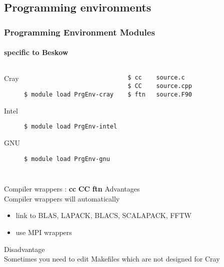 \subsection{Programming environments}
\begin{frame}[fragile]
  \frametitle{Programming Environment Modules}
  \framesubtitle{specific to \alert{Beskow}}

\begin{columns}[t]
  \begin{description}
  \item [Cray] \verb|$ module load PrgEnv-cray|
  \item [Intel] \verb|$ module load PrgEnv-intel|
  \item [GNU] \verb|$ module load PrgEnv-gnu|
  \end{description}
    \begin{verbatim}
$ cc	source.c
$ CC	source.cpp
$ ftn	source.F90
  \end{verbatim}
\end{columns}
  \begin{exampleblock}{Compiler wrappers : \alert{\textbf{cc} \textbf{CC} \textbf{ftn}}}
    \alert{Advantages}\\
    Compiler wrappers will automatically 
    \begin{itemize}
      \item link to BLAS, LAPACK, BLACS, SCALAPACK, FFTW\\
      \item use MPI wrappers\\
    \end{itemize}
    \alert{Disadvantage}\\
    Sometimes you need to edit Makefiles which are not designed for Cray 
\end{exampleblock}
\end{frame}



